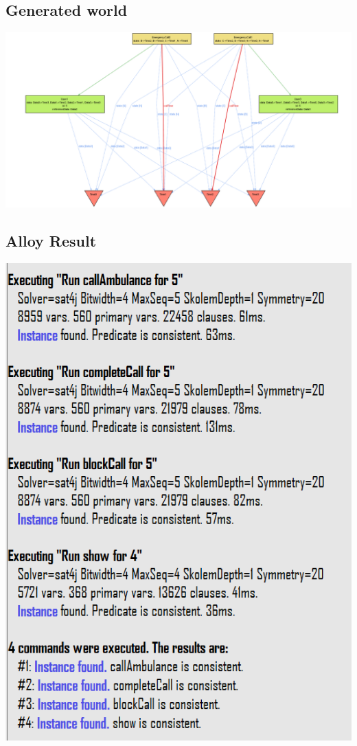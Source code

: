 \subsection{Generated world}
\includegraphics[width = \textheight, angle=90]{sections/alloy/GenWorldASOS.png}
\subsection{Alloy Result}
\includegraphics[height = \textheight]{sections/alloy/resultASOS.png}

